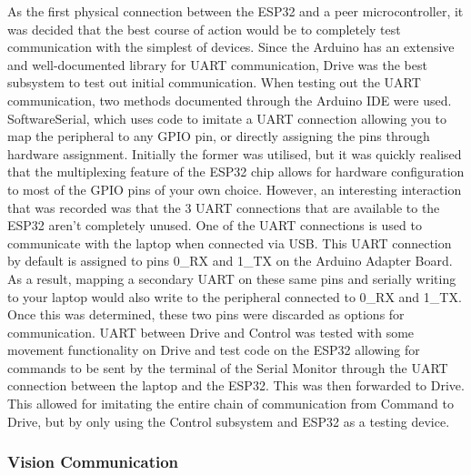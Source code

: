 \documentclass[a4paper]{article}
\begin{document}
As the first physical connection between the ESP32 and a peer 
microcontroller, it was decided that the best course of action would 
be to completely test communication with the simplest of devices. Since 
the Arduino has an extensive and well-documented library for UART 
communication, Drive was the best subsystem to test out initial 
communication. When testing out the UART communication, two methods 
documented through the Arduino IDE were used. SoftwareSerial, which uses 
code to imitate a UART connection allowing you to map the peripheral to 
any GPIO pin, or directly assigning the pins through hardware assignment. 
Initially the former was utilised, but it was quickly realised that the 
multiplexing feature of the ESP32 chip allows for hardware configuration 
to most of the GPIO pins of your own choice. However, an interesting 
interaction that was recorded was that the 3 UART connections that are 
available to the ESP32 aren’t completely unused. One of the UART 
connections is used to communicate with the laptop when connected via USB. 
This UART connection by default is assigned to pins 0\_RX and 1\_TX on the 
Arduino Adapter Board. As a result, mapping a secondary UART on these 
same pins and serially writing to your laptop would also write to the 
peripheral connected to 0\_RX and 1\_TX. Once this was determined, these 
two pins were discarded as options for communication. UART between Drive 
and Control was tested with some movement functionality on Drive and test 
code on the ESP32 allowing for commands to be sent by the terminal of the 
Serial Monitor through the UART connection between the laptop and the 
ESP32. This was then forwarded to Drive. This allowed for imitating the 
entire chain of communication from Command to Drive, but by only using the 
Control subsystem and ESP32 as a testing device.

\subsubsection{Vision Communication}
\end{document}
